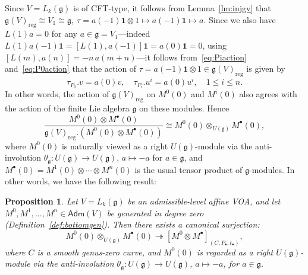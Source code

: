 \documentclass[12pt,a4paper,reqno]{amsart}
\numberwithin{equation}{section}
\newtheorem{proposition}[theorem]{Proposition}
\theoremstyle{definition}
\newcommand{\g}{\mathfrak{g}}
\def\Adm{\mathsf{Adm}}
\def\vac{\mathbf{1}}
\def\o{\otimes}
\def\ra{\rightarrow}
\def\ds{\dots}
\def\reg{\mathrm{reg}}
\begin{document}
Since $V=L_k(\g)$ is of CFT-type, it follows from Lemma~\ref{lm:injgv} that $\g(V)_\reg\cong V_1\cong \g,\ \tau=a(-1)\vac\o 1\mapsto a(-1)\vac\mapsto a$. Since we also have $L(1)a=0$ for any $a\in \g=V_1$---indeed $L(1)a(-1)\vac=[L(1),a(-1)]\vac=a(0)\vac=0$, using $[L(m),a(n)]=-n\,a(m+n)$---it follows from~\eqref{eq:Piaction} and~\eqref{eq:P0action} that the action of $\tau=a(-1)\vac\o 1\in \g(V)_\reg$ is given by
\[
\tau_{P_0}. v=a(0)v,\quad \tau_{P_i}.u^i=a(0)u^i,\quad 1\leq i\leq n.
\]
In other words, the action of $\g(V)_\reg$ on $M^0(0)$ and $M^i(0)$ also agrees with the action of the finite Lie algebra $\g$ on these modules.
Hence
\[
  \frac{M^0(0)\o M^\bullet(0)}{\g(V)_\reg.(M^0(0)\o M^\bullet(0))}\cong M^0(0)\o_{U(\g)} M^\bullet (0),
\]
where $M^0(0)$ is naturally viewed as a right $U(\g)$-module via the anti-involution $\theta_\g: U(\g)\ra U(\g)$, $a\mapsto -a$ for $a\in \g$, and $M^\bullet(0)=M^1(0)\o\cdots\o M^n(0)$ is the usual tensor product of $\g$-modules.
In other words, we have the following result:
\begin{proposition}
Let $V=L_k(\g)$ be an admissible-level affine VOA, and let $M^0,M^1,\ds,M^n\in \Adm(V)$ be generated in degree zero (Definition~\ref{def:bottomgen}). Then 
there exists a canonical surjection:
\begin{equation}\label{eq:gsurj}
M^0(0)\o_{U(\g)} M^\bullet (0)\twoheadrightarrow [M^0\o M^\bullet]_{(C,P_\bullet,t_\bullet)},
\end{equation}
where $C$ is a smooth genus-zero curve, and $M^0(0)$ is regarded as a right $U(\g)$-module via the anti-involution $\theta_\g: U(\g) \rightarrow U(\g)$, $a \mapsto -a$, for $a\in \g$.
\end{proposition}
\end{document}
